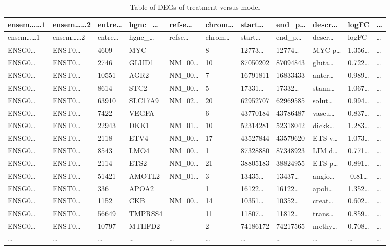 \documentclass[
]{article}
\begin{document}
\begin{longtable}[]{@{}lllllllllll@{}}
\caption{\label{tab:table-of-DEGs-of-treatment-versus-model}Table of DEGs of treatment versus model}\tabularnewline
\toprule
ensem\ldots\ldots1 & ensem\ldots\ldots2 & entre\ldots{} & hgnc\_\ldots{} & refse\ldots{} & chrom\ldots{} & start\ldots{} & end\_p\ldots{} & descr\ldots{} & logFC & \ldots{}\tabularnewline
\midrule
\endfirsthead
\toprule
ensem\ldots\ldots1 & ensem\ldots\ldots2 & entre\ldots{} & hgnc\_\ldots{} & refse\ldots{} & chrom\ldots{} & start\ldots{} & end\_p\ldots{} & descr\ldots{} & logFC & \ldots{}\tabularnewline
\midrule
\endhead
ENSG0\ldots{} & ENST0\ldots{} & 4609 & MYC & & 8 & 12773\ldots{} & 12774\ldots{} & MYC p\ldots{} & 1.356\ldots{} & \ldots{}\tabularnewline
ENSG0\ldots{} & ENST0\ldots{} & 2746 & GLUD1 & NM\_00\ldots{} & 10 & 87050202 & 87094843 & gluta\ldots{} & 0.722\ldots{} & \ldots{}\tabularnewline
ENSG0\ldots{} & ENST0\ldots{} & 10551 & AGR2 & NM\_00\ldots{} & 7 & 16791811 & 16833433 & anter\ldots{} & 0.989\ldots{} & \ldots{}\tabularnewline
ENSG0\ldots{} & ENST0\ldots{} & 8614 & STC2 & NM\_00\ldots{} & 5 & 17331\ldots{} & 17332\ldots{} & stann\ldots{} & 1.067\ldots{} & \ldots{}\tabularnewline
ENSG0\ldots{} & ENST0\ldots{} & 63910 & SLC17A9 & NM\_02\ldots{} & 20 & 62952707 & 62969585 & solut\ldots{} & 0.994\ldots{} & \ldots{}\tabularnewline
ENSG0\ldots{} & ENST0\ldots{} & 7422 & VEGFA & & 6 & 43770184 & 43786487 & vascu\ldots{} & 0.837\ldots{} & \ldots{}\tabularnewline
ENSG0\ldots{} & ENST0\ldots{} & 22943 & DKK1 & NM\_01\ldots{} & 10 & 52314281 & 52318042 & dickk\ldots{} & 1.283\ldots{} & \ldots{}\tabularnewline
ENSG0\ldots{} & ENST0\ldots{} & 2118 & ETV4 & NM\_00\ldots{} & 17 & 43527844 & 43579620 & ETS v\ldots{} & 1.073\ldots{} & \ldots{}\tabularnewline
ENSG0\ldots{} & ENST0\ldots{} & 8543 & LMO4 & NM\_00\ldots{} & 1 & 87328880 & 87348923 & LIM d\ldots{} & 0.771\ldots{} & \ldots{}\tabularnewline
ENSG0\ldots{} & ENST0\ldots{} & 2114 & ETS2 & NM\_00\ldots{} & 21 & 38805183 & 38824955 & ETS p\ldots{} & 0.891\ldots{} & \ldots{}\tabularnewline
ENSG0\ldots{} & ENST0\ldots{} & 51421 & AMOTL2 & NM\_01\ldots{} & 3 & 13435\ldots{} & 13437\ldots{} & angio\ldots{} & -0.81\ldots{} & \ldots{}\tabularnewline
ENSG0\ldots{} & ENST0\ldots{} & 336 & APOA2 & & 1 & 16122\ldots{} & 16122\ldots{} & apoli\ldots{} & 1.352\ldots{} & \ldots{}\tabularnewline
ENSG0\ldots{} & ENST0\ldots{} & 1152 & CKB & NM\_00\ldots{} & 14 & 10351\ldots{} & 10352\ldots{} & creat\ldots{} & 0.602\ldots{} & \ldots{}\tabularnewline
ENSG0\ldots{} & ENST0\ldots{} & 56649 & TMPRSS4 & & 11 & 11807\ldots{} & 11812\ldots{} & trans\ldots{} & 0.859\ldots{} & \ldots{}\tabularnewline
ENSG0\ldots{} & ENST0\ldots{} & 10797 & MTHFD2 & & 2 & 74186172 & 74217565 & methy\ldots{} & 0.708\ldots{} & \ldots{}\tabularnewline
\ldots{} & \ldots{} & \ldots{} & \ldots{} & \ldots{} & \ldots{} & \ldots{} & \ldots{} & \ldots{} & \ldots{} & \ldots{}\tabularnewline
\bottomrule
\end{longtable}
\end{document}
